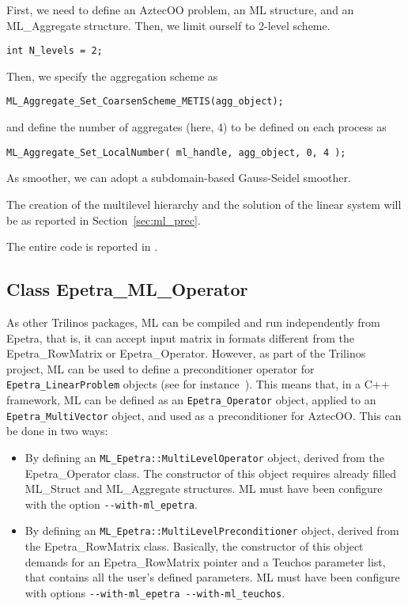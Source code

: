 First, we need to define an AztecOO problem, an ML structure, and an
ML\_Aggregate structure. Then, we limit ourself to 2-level scheme.
\begin{verbatim}
int N_levels = 2;
\end{verbatim}
Then, we specify the aggregation scheme as
\begin{verbatim}
ML_Aggregate_Set_CoarsenScheme_METIS(agg_object);
\end{verbatim}
and define the number of aggregates (here, 4) to be defined on each
process as
\begin{verbatim}
ML_Aggregate_Set_LocalNumber( ml_handle, agg_object, 0, 4 );
\end{verbatim}

As smoother, we can adopt a subdomain-based Gauss-Seidel smoother.

The creation of the multilevel hierarchy and the solution of the linear
system will be as reported in Section~\ref{sec:ml_prec}.

The entire code is reported in .


\subsection{Class Epetra\_ML\_Operator}
\label{ML_Operator}

As other Trilinos packages, ML can be compiled and run independently
from Epetra, that is, it can accept input matrix in formats different
from the Epetra\_RowMatrix or Epetra\_Operator. However, as part of the
Trilinos project, ML can be used to define a preconditioner operator for
\verb!Epetra_LinearProblem! objects (see for
instance~\cite{Epetra-Ref-Guide}). This means that, in a C++ framework,
ML can be defined as an \verb!Epetra_Operator! object, applied to an
\verb!Epetra_MultiVector!  object, and used as a preconditioner for
AztecOO.  This can be done in two ways:
\begin{itemize}
\item By defining an \verb!ML_Epetra::MultiLevelOperator! object, derived from the
  Epetra\_Operator class. The constructor of this object requires
  already filled ML\_Struct and ML\_Aggregate structures.  ML must have
  been configure with the option \verb!--with-ml_epetra!.
\item By defining an \verb!ML_Epetra::MultiLevelPreconditioner! object, derived
  from the Epetra\_RowMatrix class. Basically, the constructor of
  this object demands for an Epetra\_RowMatrix  pointer and a
  Teuchos parameter list, that contains all the user's defined
  parameters. ML must have been configure with options
  \verb!--with-ml_epetra --with-ml_teuchos!.
\end{itemize}

